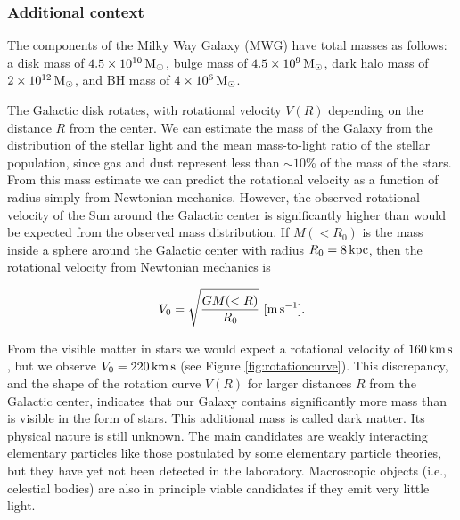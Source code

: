 \documentclass[a4paper,11pt]{article}
\begin{document}
\subsubsection{Additional context}

The components of the Milky Way Galaxy (MWG) have total masses as follows: a disk mass of $4.5\times10^{10}\,{\rm M_\odot}$, bulge mass of $4.5\times10^9\,{\rm M_\odot}$, dark halo mass of $2\times10^{12}\,{\rm M_\odot}$, and BH mass of $4\times10^6\,{\rm M_\odot}$.

{\noindent}The Galactic disk rotates, with rotational velocity $V(R)$ depending on the distance $R$ from the center. We can estimate the mass of the Galaxy from the distribution of the stellar light and the mean mass-to-light ratio of the stellar population, since gas and dust represent less than $\sim10$\% of the mass of the stars. From this mass estimate we can predict the rotational velocity as a function of radius simply from Newtonian mechanics. However, the observed rotational velocity of the Sun around the Galactic center is significantly higher than would be expected from the observed mass distribution. If $M(<R_0)$ is the mass inside a sphere around the Galactic center with radius $R_0=8\,{\rm kpc}$, then the rotational velocity from Newtonian mechanics is

\begin{align*}
    V_0 = \sqrt{\frac{GM(<R)}{R_0}} ~ [{\rm m\,s^{-1}}].
\end{align*}

{\noindent}From the visible matter in stars we would expect a rotational velocity of $160\,{\rm km\,s}$, but we observe $V_0=220\,{\rm km\,s}$ (see Figure \ref{fig:rotationcurve}). This discrepancy, and the shape of the rotation curve $V(R)$ for larger distances $R$ from the Galactic center, indicates that our Galaxy contains significantly more mass than is visible in the form of stars. This additional mass is called dark matter. Its physical nature is still unknown. The main candidates are weakly interacting elementary particles like those postulated by some elementary particle theories, but they have yet not been detected in the laboratory. Macroscopic objects (i.e., celestial bodies) are also in principle viable candidates if they emit very little light.
\end{document}
